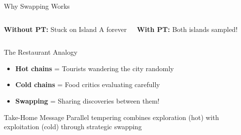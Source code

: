 \documentclass[aspectratio=169]{beamer}
\begin{document}
\begin{frame}{Why Swapping Works}
\begin{columns}
		\vspace{0.2cm}
		\textbf{Without PT:} Stuck on Island A forever

		\textbf{With PT:} Both islands sampled!
	\end{columns}

	\vspace{0.3cm}

	\begin{block}{The Restaurant Analogy}
		\begin{itemize}
			\item \textbf{Hot chains} = Tourists wandering the city randomly
			\item \textbf{Cold chains} = Food critics evaluating carefully
			\item \textbf{Swapping} = Sharing discoveries between them!
		\end{itemize}
	\end{block}

	\begin{alertblock}{Take-Home Message}
		Parallel tempering combines exploration (hot) with exploitation (cold) through strategic swapping
	\end{alertblock}

\end{frame}
\end{document}

